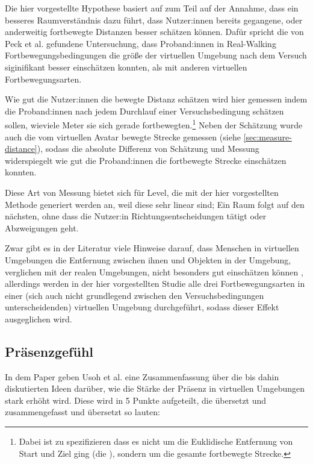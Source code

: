             Die hier vorgestellte Hypothese basiert auf zum Teil auf der Annahme, dass ein besseres Raumverständnis dazu führt, dass Nutzer:innen bereits gegangene, oder anderweitig fortbewegte Distanzen besser schätzen können. Dafür spricht die von Peck et al. \cite{peck-vergleich-2011} gefundene Untersuchung, dass Proband:innen in Real-Walking Fortbewegungsbedingungen die größe der virtuellen Umgebung nach dem Versuch siginifikant besser einschätzen konnten, als mit anderen virtuellen Fortbewegungsarten.

            Wie gut die Nutzer:innen die bewegte Distanz schätzen wird hier gemessen indem die Proband:innen nach jedem Durchlauf einer Versuchsbedingung schätzen sollen, wieviele Meter sie sich gerade fortbewegten.\footnote{Dabei ist zu spezifizieren dass es nicht um die Euklidische Entfernung von Start und Ziel ging (die ), sondern um die gesamte fortbewegte Strecke.}
            Neben der Schätzung wurde auch die vom virtuellen Avatar bewegte Strecke gemessen (siehe \autoref{sec:measure-distance}), sodass die absolute Differenz von Schätzung und Messung widerspiegelt wie gut die Proband:innen die fortbewegte Strecke einschätzen konnten.

            Diese Art von Messung bietet sich für Level, die mit der hier vorgestellten Methode generiert werden an, weil diese sehr linear sind; Ein Raum folgt auf den nächsten, ohne dass die Nutzer:in Richtungsentscheidungen tätigt oder Abzweigungen geht.

            Zwar gibt es in der Literatur viele Hinweise darauf, dass Menschen in virtuellen Umgebungen die Entfernung zwischen ihnen und Objekten in der Umgebung, verglichen mit der realen Umgebungen,  nicht besonders gut einschätzen können \cite{meta-distance-perception, bruder-distance}, %
            allerdings werden in der hier vorgestellten Studie alle drei Fortbewegungsarten in einer (sich auch nicht grundlegend zwischen den Versuchsbedingungen unterscheidenden) virtuellen Umgebung durchgeführt, sodass dieser Effekt ausgeglichen wird.

        \subsection{Präsenzgefühl}
            In dem Paper \cite{presence-questionaire} geben Usoh et al. eine Zusammenfassung über die bis dahin diskutierten Ideen darüber, wie die Stärke der Präsenz in virtuellen Umgebungen stark erhöht wird. Diese wird in 5 Punkte aufgeteilt, die übersetzt und zusammengefasst und übersetzt so lauten:

